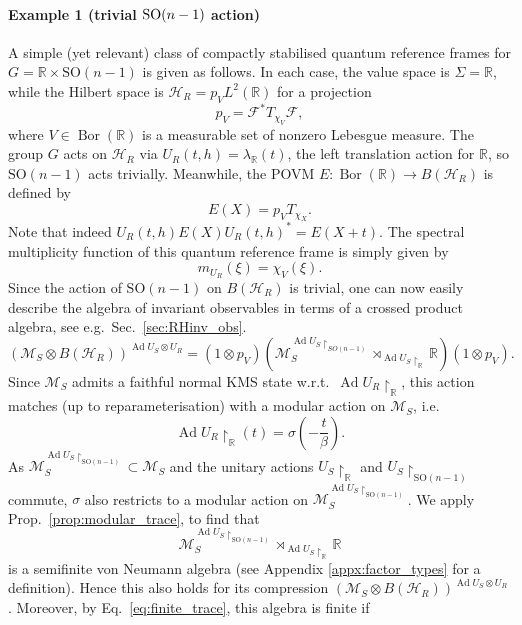 \documentclass[sn-mathphys-num]{sn-jnl}%
\newcommand{\RR}{\mathbb{R}}
\newcommand{\HH}{\mathcal{H}}
\newcommand{\MM}{\mathcal{M}}
\DeclareMathOperator{\Bor}{Bor}
\DeclareMathOperator{\Ad}{Ad}
\numberwithin{equation}{section}
\theoremstyle{thmstyleone}%
\theoremstyle{thmstyletwo}%
\theoremstyle{thmstylethree}%
\begin{document}
\paragraph{Example 1 (trivial $\textnormal{SO}(n-1)$ action)} A simple (yet relevant) class of compactly stabilised quantum reference frames for $G=\RR\times \mathrm{SO}(n-1)$ is given as follows. In each case, the value space is $\Sigma=\RR$, while the Hilbert space is $\HH_R=p_V L^2(\RR)$ for a projection
\begin{equation}
    p_V=\mathcal{F}^*T_{\chi_V}\mathcal{F},
\end{equation}
where $V\in \Bor(\RR)$ is a measurable set of nonzero Lebesgue measure. The group $G$ acts on $\HH_R$ via $U_R(t,h)=\lambda_\RR(t)$, the left translation action for $\RR$, so $\mathrm{SO}(n-1)$ acts trivially. Meanwhile, the POVM $E:\Bor(\RR)\to B(\HH_R)$ is defined by
\begin{equation}
    E(X)=p_V T_{\chi_X}.
\end{equation}
Note that indeed $U_R(t,h)E(X)U_R(t,h)^*=E(X+t)$. The spectral multiplicity function of this quantum reference frame is simply given by
\begin{equation}
    m_{U_R}(\xi)=\chi_V(\xi).
\end{equation} 
Since the action of $\mathrm{SO}(n-1)$ on $B(\HH_R)$ is trivial, one can now easily describe the algebra of invariant observables in terms of a crossed product algebra, see e.g.\ Sec.\ \ref{sec:RHinv_obs}.
\begin{equation}
    (\MM_S\otimes B(\HH_R))^{\Ad U_S\otimes U_R}=(1\otimes p_V)\left(\MM_S^{\Ad U_S\restriction_{SO(n-1)}}\rtimes_{\Ad U_S\restriction_\RR}\RR\right)(1\otimes p_V).
\end{equation}
Since $\MM_S$ admits a faithful normal KMS state w.r.t.\ $\Ad U_R\restriction_\RR$, this action matches (up to reparameterisation) with a modular action on $\MM_S$, i.e.\ \begin{equation}\label{eq:accountancy}
    \Ad U_R\restriction_\RR(t)=\sigma\left(-\frac{t}{\beta}\right).
\end{equation} As $\MM_S^{\Ad U_S\restriction_{\mathrm{SO}(n-1)}}\subset \MM_S$ and the unitary actions $U_S\restriction_{\RR}$ and $U_S\restriction_{\mathrm{SO}(n-1)}
$ commute, $\sigma$ also restricts to a modular action on $\MM_S^{\Ad U_S\restriction_{\mathrm{SO}(n-1)}}$. We apply Prop.\ \ref{prop:modular_trace}, to find that \begin{equation}
    \MM_S^{\Ad U_S\restriction_{\mathrm{SO}(n-1)}}\rtimes_{\Ad U_S\restriction_\RR}\RR
\end{equation} is a semifinite von Neumann algebra (see Appendix \ref{appx:factor_types} for a definition). Hence this also holds for its compression $(\MM_S\otimes B(\HH_R))^{\Ad U_S\otimes U_R}$. Moreover, by Eq.\ \eqref{eq:finite_trace}, this algebra is finite if
\end{document}
